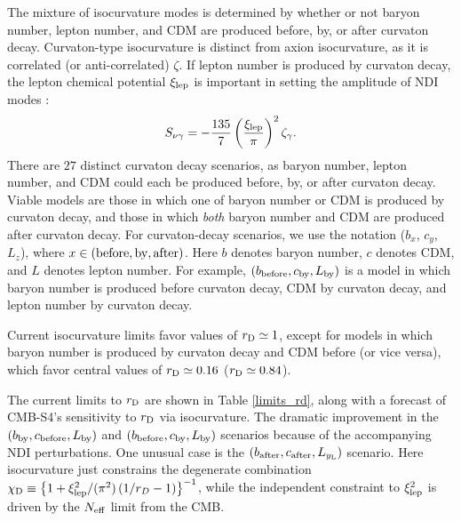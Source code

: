 The mixture of isocurvature modes is determined by whether or not baryon number, lepton number, and CDM are produced before, by, or after curvaton decay. Curvaton-type isocurvature is distinct from axion isocurvature, as it is correlated (or anti-correlated) $\zeta$. If lepton number is produced by curvaton decay, the lepton chemical potential $\xi_{\rm lep}$ is important in setting the amplitude of NDI modes \cite{Lyth:2002my,Gordon:2003hw,DiValentino:2011sv}:
\begin{equation}
S_{\nu \gamma}=
-\frac{135}{7}\left(\frac{\xi_{\rm lep}}{\pi}\right)^2\zeta_{\gamma}.\end{equation}
There are $27$ distinct curvaton decay scenarios, as baryon number, lepton number, and CDM could each be produced before, by, or after curvaton decay. Viable models are those in which one of baryon number or CDM is produced by curvaton decay, and those in which \textit{both} baryon number and CDM are produced after curvaton decay. For curvaton-decay scenarios, we use the notation ($b_{x}$, $c_{y}$, $L_{z}$), where $x\in ({\rm before, by, after})$. Here $b$ denotes baryon number, $c$ denotes CDM, and $L$ denotes lepton number. For example, $(b_{\rm before}, c_{\rm by}, L_{\rm by})$ is a model in which baryon number is produced before curvaton decay, CDM by curvaton decay, and lepton number by curvaton decay.

Current isocurvature limits favor values of $r_{\rm D}\simeq 1$, except for models in which baryon number is produced by curvaton decay and CDM before (or vice versa), which favor central values of $r_{\rm D} \simeq 0.16$ ($r_{\rm D} \simeq 0.84$). 

The current limits \cite{Smith/Grin:2015} to $r_{\rm D}$ are shown in Table \ref{limits_rd}, along with a forecast of CMB-S4's sensitivity to $r_{\rm D}$ via isocurvature. The dramatic improvement in the $(b_{\rm by},c_{\rm before},L_{\rm by})$ and $(b_{\rm before},c_{\rm by},L_{\rm by})$ scenarios because of the accompanying NDI perturbations. One unusual case is the $(b_{\rm after},c_{\rm after}, L_{y_{\rm L}})$ scenario. Here isocurvature just constrains the degenerate combination \cite{Smith/Grin:2015} $\chi_{\rm D} \equiv \left\{1+\xi_{\rm lep}^2/(\pi^2) \left(1/r_D -1\right)\right\}^{-1}$, while the independent constraint to $\xi_{\rm lep}^{2}$ is driven by the $N_{\rm eff}$ limit from the CMB.

